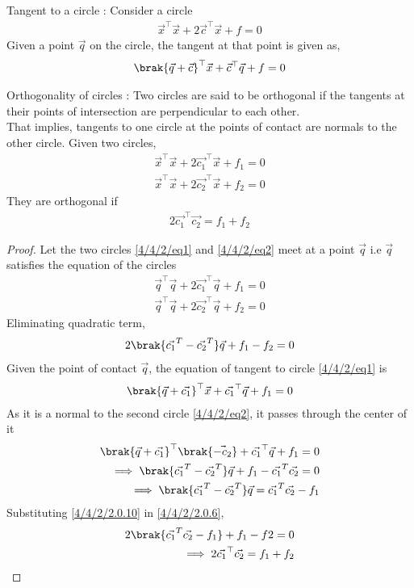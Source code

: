 \begin{lemma}
Tangent to a circle : Consider a circle 
\begin{align}
    \vec{x}^\top\vec{x} + 2\vec{c}^\top\vec{x} + f = 0 
\end{align}
Given a point $\vec{q}$ on the circle, the tangent at that point is given as,
\begin{align}
    \brak{\vec{q}+\vec{c}}^\top\vec{x} + \vec{c}^\top\vec{q} + f = 0 
\end{align}
\end{lemma}
\begin{lemma}
Orthogonality of circles : Two circles are said to be orthogonal if  the tangents at their points of intersection are perpendicular to each other.\\ That implies, tangents to one circle at the points of contact are normals to the other circle. 
Given two circles,
\begin{align}
    \vec{x}^\top\vec{x} + 2\vec{c_1}^\top\vec{x} + f_1 = 0 \label{4/4/2/eq1}\\
    \vec{x}^\top\vec{x} + 2\vec{c_2}^\top\vec{x} + f_2 = 0 \label{4/4/2/eq2}
\end{align}
They are orthogonal if
\begin{align}
    2\vec{c_1}^\top\vec{c_2} = f_1 + f_2 \label{4/4/2/condition}
\end{align}
\end{lemma}
\begin{proof}
Let the two circles \eqref{4/4/2/eq1} and \eqref{4/4/2/eq2} meet at a point $\vec{q}$ i.e $\vec{q}$ satisfies the equation of the circles
\begin{align}
    \vec{q}^\top\vec{q} + 2\vec{c_1}^\top\vec{q} + f_1 = 0 \label{4/4/2/2.0.4}\\
    \vec{q}^\top\vec{q} + 2\vec{c_2}^\top\vec{q} + f_2 = 0 \label{4/4/2/2.0.5}
\end{align}
Eliminating quadratic term,
\begin{align}
    2\brak{\vec{c_1}^T - \vec{c_2}^T}\vec{q} + f_1 - f_2 = 0 \label{4/4/2/2.0.6}
\end{align}
Given the point of contact $\vec{q}$, the equation of tangent to circle \eqref{4/4/2/eq1} is
\begin{align}
    \brak{\vec{q}+\vec{c_1}}^\top\vec{x} + \vec{c_1}^\top\vec{q} + f_1 = 0 
\end{align}
As it is a normal to the second circle \eqref{4/4/2/eq2}, it passes through the center of it
\begin{align}
    \brak{\vec{q}+\vec{c_1}}^\top\brak{\vec{-c_2}} + \vec{c_1}^\top\vec{q} + f_1 = 0 \\
    \implies \brak{\vec{c_1}^T - \vec{c_2}^T}\vec{q} + f_1 - \vec{c_1}^T\vec{c_2} = 0 \\
    \implies \brak{\vec{c_1}^T - \vec{c_2}^T}\vec{q} = \vec{c_1}^T\vec{c_2} - f_1
    \label{4/4/2/2.0.10}
\end{align}
Substituting \eqref{4/4/2/2.0.10} in \eqref{4/4/2/2.0.6},
\begin{align}
    2\brak{\vec{c_1}^T\vec{c_2} - f_1}  + f_1 - f2 = 0 \\
    \implies 2\vec{c_1}^\top\vec{c_2} = f_1 + f_2 
\end{align}
\end{proof}
